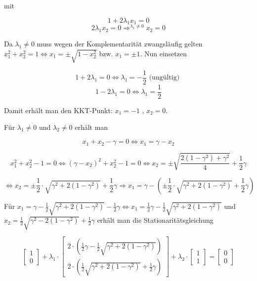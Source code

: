\documentclass[a4paper, 12pt]{report}
\begin{document}
mit

$$1 + 2\lambda_1x_1 = 0$$
$$2\lambda_1x_2 = 0 \Rightarrow^{\lambda_1 \neq 0} x_2 = 0$$

Da $\lambda_1 \neq 0$ muss wegen der Komplementarität zwangsläufig gelten\\
$x_1^2 + x_2^2 = 1 \Leftrightarrow x_1 = \pm \sqrt{1 - x_2^2}$ bzw. $x_1 = \pm 1$. Nun einsetzen

$$1 + 2\lambda_1 = 0 \Leftrightarrow \lambda_1 = -\frac{1}{2} \text{  (ungültig) }$$
$$1 - 2\lambda_1 = 0 \Leftrightarrow \lambda_1 = \frac{1}{2}$$

Damit erhält man den KKT-Punkt: $x_1 = -1 \text{ , } x_2 = 0$.\par

Für $\lambda_1 \neq 0$ und $\lambda_2 \neq 0$ erhält man

$$x_1 + x_2 - \gamma = 0 \Leftrightarrow x_1 = \gamma - x_2$$

$$x_1^2 + x_2^2 - 1 = 0 \Leftrightarrow (\gamma - x_2)^2 + x_2^2 - 1 = 0 \Leftrightarrow x_2 = \pm \sqrt{\frac{2(1-\gamma^2) + \gamma^2}{4}} + \frac{1}{2}\gamma$$

$$\Leftrightarrow x_2 = \pm \frac{1}{2}\cdot \sqrt{\gamma^2 + 2(1-\gamma^2)} + \frac{1}{2}\gamma \Rightarrow x_1 = \gamma - \left(\pm \frac{1}{2}\cdot \sqrt{\gamma^2 + 2(1-\gamma^2)} + \frac{1}{2}\gamma \right)$$

Für $x_1 = \gamma - \frac{1}{2}\sqrt{\gamma^2 + 2(1 - \gamma^2)} - \frac{1}{2}\gamma \Leftrightarrow x_1 = \frac{1}{2}\gamma - \frac{1}{2}\sqrt{\gamma^2 + 2(1 - \gamma^2)}$ und\\
$x_2 = \frac{1}{2}\sqrt{\gamma^2 - 2(1 - \gamma^2)} + \frac{1}{2}\gamma$ erhält man die Stationaritätsgleichung

$$\begin{bmatrix}1\\0\end{bmatrix} + \lambda_1 \cdot \begin{bmatrix}2\cdot\left(\frac{1}{2}\gamma - \frac{1}{2}\sqrt{\gamma^2 + 2(1 - \gamma^2)}\right)\\2\cdot\left(\frac{1}{2}\sqrt{\gamma^2 + 2(1 - \gamma^2)} + \frac{1}{2}\gamma\right)\end{bmatrix} + \lambda_2\cdot\begin{bmatrix}1\\1\end{bmatrix} = \begin{bmatrix}0\\0\end{bmatrix}$$
\end{document}
